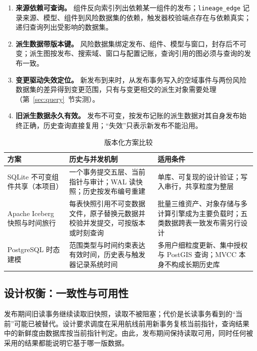 \documentclass[a4paper,11pt,UTF8]{ctexart}
\begin{document}
\begin{enumerate}
\item \textbf{来源依赖可查询。} 组件反向索引列出依赖某一组件的发布；\texttt{lineage\_edge} 记录来源、模型、组件到风险数据集的依赖，触发器校验端点存在与依赖真实；递归查询列出受影响的数据集。
\item \textbf{派生数据带版本键。} 风险数据集绑定发布、组件、模型与窗口，封存后不可变；派生图按发布、搜索域、窗口与配置记账，查询引用的图必须与查询的发布一致。
\item \textbf{变更驱动失效定位。} 新发布到来时，从发布事务写入的空域事件与两份风险数据集的差异得到变更范围，只有与变更相交的派生对象需要处理（第~\ref{sec:query}~节实测）。
\item \textbf{旧派生数据永久有效。} 发布不可变，按发布记账的派生数据对其自身发布始终正确，历史查询直接复用；“失效”只表示新发布不能沿用。
\end{enumerate}

\begin{table}[!htbp]\centering\small
\caption{版本化方案比较}
\begin{tabularx}{\textwidth}{L{3.4cm}YY}
\toprule
方案 & 历史与并发机制 & 适用条件 \\
\midrule
SQLite 不可变组件共享（本项目） & 一个事务提交五层、当前指针与审计；WAL 读快照；历史按发布编号重建 & 单库、可复现的设计验证；写入串行，共享粒度为整层 \\
Apache Iceberg 快照与时间旅行 & 每表快照引用不可变数据文件，原子替换元数据并校验并发提交，可按版本或时刻查询 \cite{iceberg-rel,iceberg-tt} & 批量三维资产、对象存储与多计算引擎成为主要负载时；五类数据跨表一致发布需另行设计 \\
PostgreSQL 时态建模 & 范围类型与时间约束表达有效时间，历史表与触发器记录系统时间 \cite{pg-create,pg-trigger} & 多用户细粒度更新、集中授权与 PostGIS 查询；MVCC 本身不构成长期历史库 \\
\bottomrule
\end{tabularx}
\end{table}

\subsection{设计权衡：一致性与可用性}

发布期间旧读事务继续读取旧快照，读取不被阻塞；代价是长读事务看到的“当前”可能已被替代。设计要求调度在采用航线前用新事务复核当前指针，查询结果中的新鲜度由数据库按当前指针判定。由此，发布期间保持读取可用，同时任何被采用的结果都能说明它基于哪一版数据。
\end{document}
